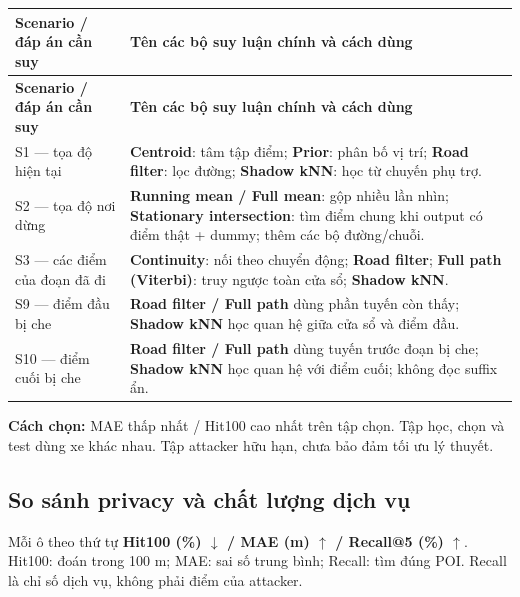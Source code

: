 \documentclass[10pt,a4paper]{article}
\begin{document}
\begingroup\small
\begin{longtable}{@{}P{4.405cm}P{12.514cm}@{}}
\toprule
\textbf{Scenario / đáp án cần suy} & \textbf{Tên các bộ suy luận chính và cách dùng}\\\midrule
\endfirsthead
\toprule
\textbf{Scenario / đáp án cần suy} & \textbf{Tên các bộ suy luận chính và cách dùng}\\\midrule
\endhead
\bottomrule\endfoot
S1 — tọa độ hiện tại & \textbf{Centroid}: tâm tập điểm; \textbf{Prior}: phân bố vị trí; \textbf{Road filter}: lọc đường; \textbf{Shadow kNN}: học từ chuyến phụ trợ.\\
\addlinespace[3pt]
S2 — tọa độ nơi dừng & \textbf{Running mean / Full mean}: gộp nhiều lần nhìn; \textbf{Stationary intersection}: tìm điểm chung khi output có điểm thật + dummy; thêm các bộ đường/chuỗi.\\
\addlinespace[3pt]
S3 — các điểm của đoạn đã đi & \textbf{Continuity}: nối theo chuyển động; \textbf{Road filter}; \textbf{Full path (Viterbi)}: truy ngược toàn cửa sổ; \textbf{Shadow kNN}.\\
\addlinespace[3pt]
S9 — điểm đầu bị che & \textbf{Road filter / Full path} dùng phần tuyến còn thấy; \textbf{Shadow kNN} học quan hệ giữa cửa sổ và điểm đầu.\\
\addlinespace[3pt]
S10 — điểm cuối bị che & \textbf{Road filter / Full path} dùng tuyến trước đoạn bị che; \textbf{Shadow kNN} học quan hệ với điểm cuối; không đọc suffix ẩn.\\
\end{longtable}
\endgroup
\textbf{Cách chọn:} MAE thấp nhất / Hit100 cao nhất trên tập chọn. Tập học, chọn và test dùng xe khác nhau. Tập attacker hữu hạn, chưa bảo đảm tối ưu lý thuyết.

\subsection{So sánh privacy và chất lượng dịch vụ}\label{sub:3.1}
Mỗi ô theo thứ tự \textbf{Hit100 (\%) $\downarrow$ / MAE (m) $\uparrow$ / Recall@5 (\%) $\uparrow$}. Hit100: đoán trong 100 m; MAE: sai số trung bình; Recall: tìm đúng POI. Recall là chỉ số dịch vụ, không phải điểm của attacker.
\end{document}
